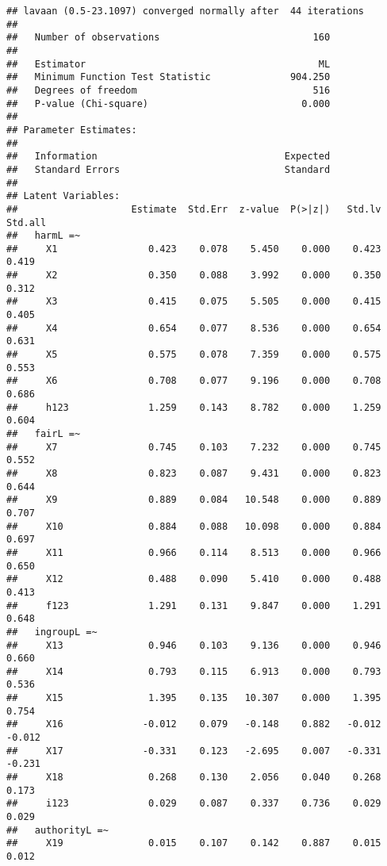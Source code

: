 \documentclass[english,man]{apa6}
\newcounter{author}
\theoremstyle{definition}
\theoremstyle{definition}
\theoremstyle{definition}
\theoremstyle{remark}
\begin{document}
\begin{verbatim}
## lavaan (0.5-23.1097) converged normally after  44 iterations
## 
##   Number of observations                           160
## 
##   Estimator                                         ML
##   Minimum Function Test Statistic              904.250
##   Degrees of freedom                               516
##   P-value (Chi-square)                           0.000
## 
## Parameter Estimates:
## 
##   Information                                 Expected
##   Standard Errors                             Standard
## 
## Latent Variables:
##                    Estimate  Std.Err  z-value  P(>|z|)   Std.lv  Std.all
##   harmL =~                                                              
##     X1                0.423    0.078    5.450    0.000    0.423    0.419
##     X2                0.350    0.088    3.992    0.000    0.350    0.312
##     X3                0.415    0.075    5.505    0.000    0.415    0.405
##     X4                0.654    0.077    8.536    0.000    0.654    0.631
##     X5                0.575    0.078    7.359    0.000    0.575    0.553
##     X6                0.708    0.077    9.196    0.000    0.708    0.686
##     h123              1.259    0.143    8.782    0.000    1.259    0.604
##   fairL =~                                                              
##     X7                0.745    0.103    7.232    0.000    0.745    0.552
##     X8                0.823    0.087    9.431    0.000    0.823    0.644
##     X9                0.889    0.084   10.548    0.000    0.889    0.707
##     X10               0.884    0.088   10.098    0.000    0.884    0.697
##     X11               0.966    0.114    8.513    0.000    0.966    0.650
##     X12               0.488    0.090    5.410    0.000    0.488    0.413
##     f123              1.291    0.131    9.847    0.000    1.291    0.648
##   ingroupL =~                                                           
##     X13               0.946    0.103    9.136    0.000    0.946    0.660
##     X14               0.793    0.115    6.913    0.000    0.793    0.536
##     X15               1.395    0.135   10.307    0.000    1.395    0.754
##     X16              -0.012    0.079   -0.148    0.882   -0.012   -0.012
##     X17              -0.331    0.123   -2.695    0.007   -0.331   -0.231
##     X18               0.268    0.130    2.056    0.040    0.268    0.173
##     i123              0.029    0.087    0.337    0.736    0.029    0.029
##   authorityL =~                                                         
##     X19               0.015    0.107    0.142    0.887    0.015    0.012

\end{verbatim}
\end{document}
